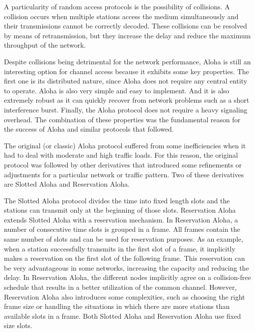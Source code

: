 \documentclass[journal]{IEEEtran}
\begin{document}
A particularity of random access protocols is the possibility of collisions.
A collision occurs when multiple stations access the medium simultaneously and their transmissions cannot be correctly decoded.
These collisions can be resolved by means of retransmission, but they increase the delay and reduce the maximum throughput of the network.

Despite collisions being detrimental for the network performance, Aloha is still an interesting option for channel access because it exhibits some key properties.
The first one is its distributed nature, since Aloha does not require any central entity to operate.
Aloha is also very simple and easy to implement.
And it is also extremely robust as it can quickly recover from network problems such as a short interference burst.
Finally, the Aloha protocol does not require a heavy signaling overhead.
The combination of these properties was the fundamental reason for the success of Aloha and similar protocols that followed.


The original (or classic) Aloha protocol suffered from some inefficiencies when it had to deal with moderate and high traffic loads.
For this reason, the original protocol was followed by other derivatives that introduced some refinements or adjustments for a particular network or traffic pattern.
Two of these derivatives are Slotted Aloha and Reservation Aloha.

The Slotted Aloha protocol divides the time into fixed length slots and the stations can transmit only at the beginning of those slots.
Reservation Aloha \cite{crowther1973sbc} extends Slotted Aloha with a reservation mechanism.
In  Reservation Aloha, a number of consecutive  time slots is grouped in a frame.
All frames contain the same number of slots and can be used for reservation purposes.
As an example, when a station successfully transmits in the first slot of a frame, it implicitly makes a reservation on the first slot of the following frame.
This reservation can be very advantageous in some networks, increasing the capacity and reducing the delay.
In Reservation Aloha, the different nodes implicitly agree on a collision-free schedule that results in a better utilization of the common channel.
However, Reservation Aloha also introduces some complexities, such as choosing the right frame size or handling the situations in which there are more stations than available slots in a frame.
Both Slotted Aloha and Reservation Aloha use fixed size slots.
\end{document}
